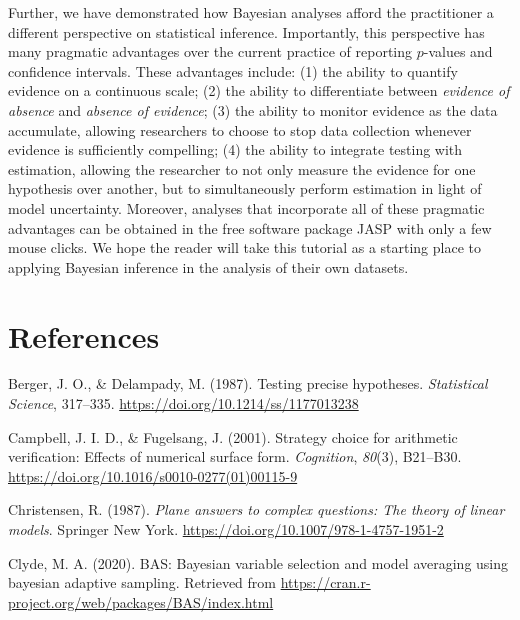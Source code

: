 \documentclass[english,,doc,floatsintext]{apa6}
\begin{document}
Further, we have demonstrated how Bayesian analyses afford the practitioner a different perspective on statistical inference. Importantly, this perspective has many pragmatic advantages over the current practice of reporting \(p\)-values and confidence intervals. These advantages include: (1) the ability to quantify evidence on a continuous scale; (2) the ability to differentiate between \emph{evidence of absence} and \emph{absence of evidence}; (3) the ability to monitor evidence as the data accumulate, allowing researchers to choose to stop data collection whenever evidence is sufficiently compelling; (4) the ability to integrate testing with estimation, allowing the researcher to not only measure the evidence for one hypothesis over another, but to simultaneously perform estimation in light of model uncertainty. Moreover, analyses that incorporate all of these pragmatic advantages can be obtained in the free software package JASP with only a few mouse clicks. We hope the reader will take this tutorial as a starting place to applying Bayesian inference in the analysis of their own datasets.

\newpage

\hypertarget{references}{%
\section{References}\label{references}}

\setlength{\parindent}{-0.5in}
\setlength{\leftskip}{0.5in}

\hypertarget{refs}{}
\leavevmode\hypertarget{ref-berger1987testing}{}%
Berger, J. O., \& Delampady, M. (1987). Testing precise hypotheses. \emph{Statistical Science}, 317--335. \url{https://doi.org/10.1214/ss/1177013238}

\leavevmode\hypertarget{ref-campbellFugelsang2001}{}%
Campbell, J. I. D., \& Fugelsang, J. (2001). Strategy choice for arithmetic verification: Effects of numerical surface form. \emph{Cognition}, \emph{80}(3), B21--B30. \url{https://doi.org/10.1016/s0010-0277(01)00115-9}

\leavevmode\hypertarget{ref-christensen2011plane}{}%
Christensen, R. (1987). \emph{Plane answers to complex questions: The theory of linear models}. Springer New York. \url{https://doi.org/10.1007/978-1-4757-1951-2}

\leavevmode\hypertarget{ref-bas}{}%
Clyde, M. A. (2020). BAS: Bayesian variable selection and model averaging using bayesian adaptive sampling. Retrieved from \url{https://cran.r-project.org/web/packages/BAS/index.html}
\end{document}
